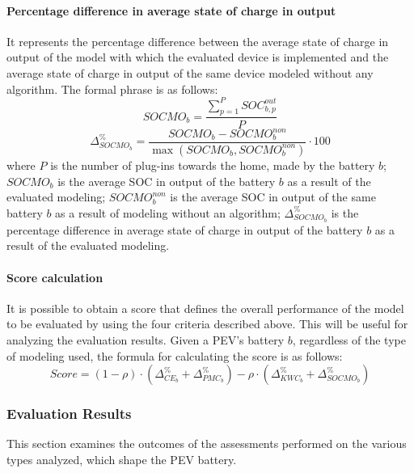 \paragraph{Percentage difference in average state of charge in output}
It represents the percentage difference between the average state of charge in output of the model with which the evaluated device is implemented and the average state of charge in output of the same device modeled without any algorithm. The formal phrase is as follows:
\begin{equation}
    SOCMO_b = \frac{\sum^{P}_{p = 1} SOC^{out}_{b, p}}{P}
\end{equation}
\begin{equation}
    \Delta ^\%_{SOCMO_b} = \frac{SOCMO_b - SOCMO^{non}_b}{\max(SOCMO_b, SOCMO^{non}_b)} \cdot 100
\end{equation}
where $P$ is the number of plug-ins towards the home, made by the battery $b$; $SOCMO_b$ is the average SOC in output of the battery $b$ as a result of the evaluated modeling; $SOCMO^{non}_b$ is the average SOC in output of the same battery $b$ as a result of modeling without an algorithm; $\Delta ^\%_{SOCMO_b}$ is the percentage difference in average state of charge in output of the battery $b$ as a result of the evaluated modeling.

    
\paragraph{Score calculation}
It is possible to obtain a score that defines the overall performance of the model to be evaluated by using the four criteria described above. This will be useful for analyzing the evaluation results. Given a PEV's battery $b$, regardless of the type of modeling used, the formula for calculating the score is as follows:
\begin{equation}
    Score = (1-\rho) \cdot (\Delta ^\%_{CE_b} + \Delta ^\%_{PMC_b}) - \rho \cdot (\Delta ^\%_{KWC_b} + \Delta ^\%_{SOCMO_b})
\end{equation}




\subsubsection{Evaluation Results}
This section examines the outcomes of the assessments performed on the various types analyzed, which shape the PEV battery.
